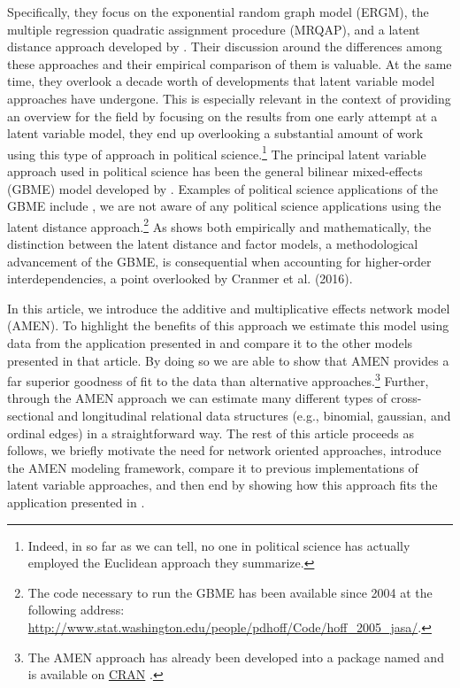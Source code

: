 Specifically, they focus on the exponential random graph model (ERGM), the multiple regression quadratic assignment procedure (MRQAP), and a latent distance approach developed by \citet{hoff:etal:2002}. Their discussion around the differences among these approaches and their empirical comparison of them is  valuable. At the same time, they overlook a decade worth of developments that latent variable model approaches have undergone. This is especially relevant in the context of providing an overview for the field by focusing on the results from one early attempt at a latent variable model, they end up overlooking a substantial amount of work using this type of approach in political science.\footnote{Indeed, in so far as we can tell, no one in political science has actually employed the Euclidean approach they summarize.} The principal latent variable approach used in political science has been the general bilinear mixed-effects (GBME) model developed by \citet{hoff:2005}. Examples of political science applications of the GBME include \citet{hoff:ward:2004,ward:etal:2007,cao:2009,cao:2010, cao:2012,breunig:etal:2012,ward:etal:2012,cao:ward:2014,metternich:etal:2015,greenhill:2015}, we are not aware of any political science applications using the latent distance approach.\footnote{The code necessary to run the GBME has been available since 2004 at the following address: \url{http://www.stat.washington.edu/people/pdhoff/Code/hoff_2005_jasa/}.} As \citet{hoff:2008} shows both empirically and mathematically, the distinction between the latent distance and factor models, a methodological advancement of the GBME, is consequential when accounting for higher-order interdependencies, a point overlooked by Cranmer et al. (2016).

In this article, we introduce the additive and multiplicative effects network model (AMEN). To highlight the benefits of this approach we estimate this model using data from  the application presented in \citet{cranmer:etal:2016} and compare it to the other models presented in that article. By doing so we are able to show that AMEN provides a far superior goodness of fit to the data than alternative approaches.\footnote{The AMEN approach has already been developed into a package named  and is available on \href{https://cran.r-project.org/web/packages/amen/index.html}{CRAN} \citep{hoff:etal:2015}.} Further, through the AMEN approach we can estimate many different types of cross-sectional and longitudinal relational data structures (e.g., binomial, gaussian, and ordinal edges) in a straightforward way. The rest of this article proceeds as follows, we briefly motivate the need for network oriented approaches, introduce the AMEN modeling framework, compare it to previous implementations of latent variable approaches, and then end by showing how this approach fits the application presented in \citet{cranmer:etal:2016}. 

